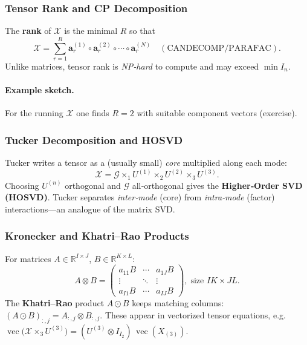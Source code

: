 \subsubsection{Tensor Rank and CP Decomposition}
The \textbf{rank} of $\mathcal{X}$ is the minimal $R$ so that
\[
  \mathcal{X}
  =\sum_{r=1}^R
   \mathbf{a}^{(1)}_r\circ\mathbf{a}^{(2)}_r\circ\cdots\circ\mathbf{a}^{(N)}_r
  \quad(\text{CANDECOMP/PARAFAC}).
\]
Unlike matrices, tensor rank is \emph{NP‑hard} to compute and may exceed \(\min I_n\).

\paragraph{Example sketch.}
For the running $\mathcal{X}$ one finds $R=2$ with
suitable component vectors (exercise).

\subsubsection{Tucker Decomposition and HOSVD}
Tucker writes a tensor as a (usually small) \emph{core} multiplied along each mode:
\[
  \mathcal{X}
  =\mathcal{G}\times_{1}U^{(1)}\times_{2}U^{(2)}\times_{3}\!U^{(3)}.
\]
Choosing $U^{(n)}$ orthogonal and $\mathcal{G}$ all‑orthogonal
gives the \textbf{Higher‑Order SVD (HOSVD)}.
Tucker separates \emph{inter‑mode} (core) from
\emph{intra‑mode} (factor) interactions—an analogue of the matrix SVD.

\subsubsection{Kronecker and Khatri–Rao Products}
For matrices $A\in\mathbb{R}^{I\times J}$, $B\in\mathbb{R}^{K\times L}$:
\[
A\otimes B
=\begin{pmatrix}
a_{11}B & \cdots & a_{1J}B\\
\vdots  & \ddots & \vdots \\
a_{I1}B & \cdots & a_{IJ}B
\end{pmatrix},\;
\text{size }IK\times JL.
\]
The \textbf{Khatri–Rao} product
$A\odot B$ keeps matching columns:
$(A\odot B)_{:,j}=A_{:,j}\otimes B_{:,j}$.
These appear in vectorized tensor equations, e.g.\
$\operatorname{vec}\bigl(\mathcal{X}\times_3U^{(3)}\bigr)=
(U^{(3)}\otimes I_{I_2})\,\operatorname{vec}(X_{(3)})$.


